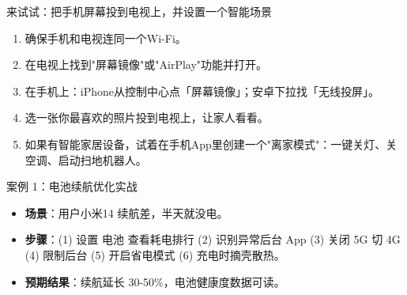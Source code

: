 \begin{tcbpractice}{来试试：把手机屏幕投到电视上，并设置一个智能场景}
\begin{enumerate}
  \item 确保手机和电视连同一个Wi-Fi。
  \item 在电视上找到"屏幕镜像"或"AirPlay"功能并打开。
  \item 在手机上：iPhone从控制中心点「屏幕镜像」；安卓下拉找「无线投屏」。
  \item 选一张你最喜欢的照片投到电视上，让家人看看。
  \item 如果有智能家居设备，试着在手机App里创建一个"离家模式"：一键关灯、关空调、启动扫地机器人。
\end{enumerate}

\end{tcbpractice}

\begin{tcbinfo}{案例 1：电池续航优化实战}
\begin{itemize}
  \item \textbf{场景}：用户小米14 续航差，半天就没电。
  \item \textbf{步骤}：(1) 设置 电池 查看耗电排行 (2) 识别异常后台 App (3) 关闭 5G 切 4G (4) 限制后台 (5) 开启省电模式 (6) 充电时摘壳散热。
  \item \textbf{预期结果}：续航延长 30-50\%，电池健康度数据可读。
\end{itemize}

\end{tcbinfo}

